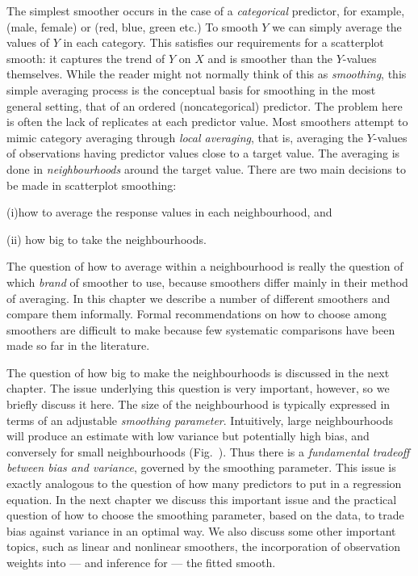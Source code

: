 The  simplest smoother occurs in the case of a {\sl categorical}
predictor,
for example,  (male, female) or  (red, blue, green etc.)
To smooth $Y$ we can simply average the values of $Y$ in each category.
This  satisfies our requirements for a scatterplot smooth: it  captures the
 trend of $Y$ on $X$ and is  smoother than the $Y$-values themselves.
While the reader might not normally think of this as {\sl smoothing}, this simple
averaging process is the conceptual basis for 
smoothing in the most general setting, that of an ordered (noncategorical)
predictor.
The problem here is often the lack of replicates at each 
predictor value.
Most smoothers attempt to mimic category averaging through
 {\sl local averaging}, that is,
averaging the
$Y$-values of observations having predictor  values close to a target
value.
The averaging is done in {\sl neighbourhoods} around the target value.
There are  two main  decisions to be made in scatterplot
smoothing:\smallskip
{\parindent 20pt
\item{(i)}how to average the
response values in each  neighbourhood, and
\item{(ii)} how big to take the neighbourhoods.

}\smallskip

\par
The question of how to average within a neighbourhood is really the
question of which {\sl brand} of smoother to use, because  smoothers
differ mainly  in their method  of averaging.
In this chapter  we describe a number of different smoothers and
compare them informally.
Formal recommendations  on how to choose among smoothers are
difficult to make because 
 few systematic  comparisons  have been made so far in the
literature.

The question of how big to make the neighbourhoods is discussed in
the next chapter.
The issue underlying this question is very important, however, so we briefly
discuss it here.
The size of the neighbourhood is typically expressed in terms of an
adjustable {\sl smoothing parameter}.
Intuitively, large neighbourhoods will produce an estimate with low
variance but potentially high bias, and conversely for small
neighbourhoods (Fig.~\spansizes).
Thus there is a {\sl fundamental tradeoff between bias and variance},
governed by the smoothing parameter.
This issue is exactly analogous to the question of how many predictors to put
in a regression equation.
In the 
next
 chapter  we discuss this important issue and the practical
question of how to choose the smoothing parameter, based on the data,
to  trade bias against variance in an optimal way.
 We also discuss some other important topics, such as
linear and nonlinear smoothers, the
incorporation of  observation weights into --- and inference
for --- the
fitted smooth.

